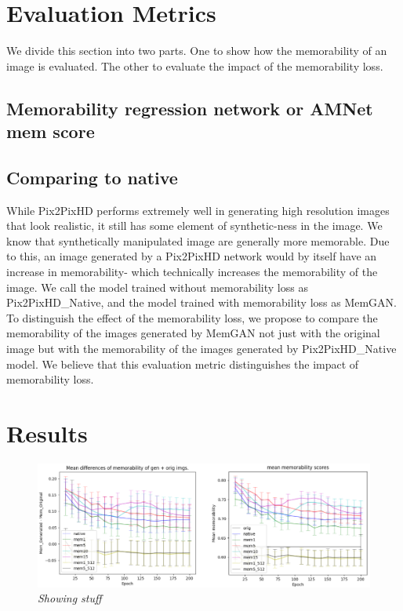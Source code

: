 \documentclass[10pt,twocolumn,letterpaper]{article}
\begin{document}
\section{Evaluation Metrics}
We divide this section into two parts. One to show how the memorability of an image is evaluated. The other to evaluate the impact of the memorability loss.
\subsection{Memorability regression network or AMNet mem score}
\label{amnet_section}
\subsection{Comparing to native}
While Pix2PixHD performs extremely well in  generating high resolution images that look realistic, it still has some element of synthetic-ness in the image. We know that synthetically manipulated image are generally more memorable. Due to this, an image generated by a Pix2PixHD network would by itself have an increase in memorability- which technically increases the memorability of the image. We call the model trained without memorability loss as Pix2PixHD\_Native, and the model trained with memorability loss as MemGAN. To distinguish the effect of the memorability loss, we propose to compare the memorability of the images generated by MemGAN not just with the original image but with the memorability of the images generated by Pix2PixHD\_Native model. We believe that this evaluation metric distinguishes the impact of memorability loss.

\section{Results}
\label{results_section}


\begin{figure}
    \centering
    \label{pic3}
    \includegraphics[width=\linewidth]{pic3.png}
    \caption{\textit{Showing stuff}}
\end{figure}
\end{document}

